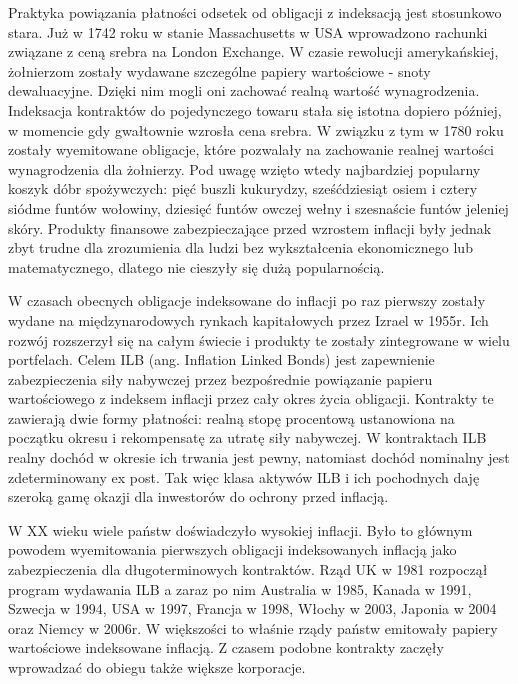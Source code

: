 \documentclass{mini}
\theoremstyle{mythstyle}
\begin{document}
	Praktyka powiązania płatności odsetek od obligacji z indeksacją jest stosunkowo stara. Już w 1742 roku w stanie Massachusetts w USA wprowadzono rachunki związane z ceną srebra na London Exchange. W czasie rewolucji amerykańskiej, żołnierzom zostały wydawane szczególne papiery wartościowe - snoty dewaluacyjne. Dzięki nim mogli oni zachować realną wartość wynagrodzenia. Indeksacja kontraktów do pojedynczego towaru stała się istotna dopiero później, w momencie gdy gwałtownie wzrosła cena srebra. W związku z tym w 1780 roku zostały wyemitowane obligacje, które pozwalały na zachowanie realnej wartości wynagrodzenia dla żołnierzy. Pod uwagę wzięto wtedy najbardziej popularny koszyk dóbr spożywczych: pięć buszli kukurydzy, sześćdziesiąt osiem i cztery siódme funtów wołowiny, dziesięć funtów owczej wełny i szesnaście funtów jeleniej skóry. Produkty finansowe zabezpieczające przed wzrostem inflacji były jednak zbyt trudne dla zrozumienia dla ludzi bez wykształcenia ekonomicznego lub matematycznego, dlatego nie cieszyły się dużą popularnością.
		
	W czasach obecnych obligacje indeksowane do inflacji po raz pierwszy zostały wydane na międzynarodowych rynkach kapitałowych przez Izrael w 1955r. Ich rozwój rozszerzył się na całym świecie i produkty te zostały zintegrowane w wielu portfelach. Celem ILB (ang. Inflation Linked Bonds) jest zapewnienie zabezpieczenia siły nabywczej przez bezpośrednie powiązanie papieru wartościowego z indeksem inflacji przez cały okres życia obligacji. Kontrakty te zawierają dwie formy płatności: realną stopę procentową ustanowiona na początku okresu i rekompensatę za utratę siły nabywczej. W kontraktach ILB realny dochód w okresie ich trwania jest pewny, natomiast dochód nominalny jest zdeterminowany ex post. Tak więc klasa aktywów ILB i ich pochodnych daję szeroką gamę okazji dla inwestorów do ochrony przed inflacją.  
		
	W XX wieku wiele państw doświadczyło wysokiej inflacji. Było to głównym powodem wyemitowania pierwszych obligacji indeksowanych inflacją jako zabezpieczenia dla długoterminowych kontraktów. Rząd UK w 1981 rozpoczął program wydawania ILB a zaraz po nim Australia w 1985, Kanada w 1991, Szwecja w 1994, USA w 1997, Francja w 1998, Włochy w 2003, Japonia w 2004 oraz Niemcy w 2006r. W większości to właśnie rządy państw emitowały papiery wartościowe indeksowane inflacją. Z czasem podobne kontrakty zaczęły wprowadzać do obiegu także większe korporacje.
	
\end{document}
